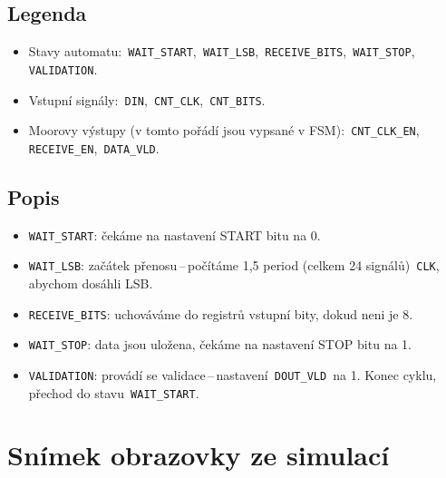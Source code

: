 \documentclass[12pt, a4paper]{article}
\begin{document}
\subsection{Legenda}
\begin{itemize}
    \item Stavy automatu:\texttt{ WAIT\_START},\texttt{ WAIT\_LSB},\texttt{ RECEIVE\_BITS},\texttt{ WAIT\_STOP},\texttt{ VALIDATION}.
    
    \item Vstupní signály:\texttt{ DIN},\texttt{ CNT\_CLK},\texttt{ CNT\_BITS}.
    
    \item Moorovy výstupy (v tomto pořádí jsou vypsané v FSM):\texttt{ CNT\_CLK\_EN},\texttt{ RECEIVE\_EN},\texttt{ DATA\_VLD}.
\end{itemize}
\subsection{Popis}
\begin{itemize}
    \item \texttt{WAIT\_START}: čekáme na nastavení START bitu na 0.
    \item \texttt{WAIT\_LSB}: začátek přenosu\,--\,počítáme 1,5 period (celkem 24 signálů)\texttt{ CLK}, abychom dosáhli  LSB.
    \item \texttt{RECEIVE\_BITS}: uchováváme do registrů vstupní bity, dokud neni je 8.
    \item \texttt{WAIT\_STOP}: data jsou uložena, čekáme na nastavení STOP bitu na 1.
    \item \texttt{VALIDATION}: provádí se validace\,--\,nastavení\texttt{ DOUT\_VLD }na 1. Konec cyklu, přechod do stavu\texttt{ WAIT\_START}.
\end{itemize}

\newpage
\section{Snímek obrazovky ze simulací}
\begin{centering}
\hfill
{}
\hfill
\end{centering}
\end{document}

